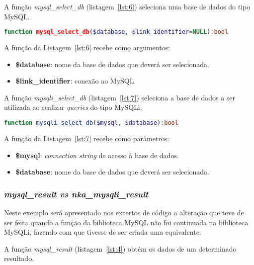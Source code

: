 A função \textit{mysql\_select\_db} (listagem~\ref{lst:6}) seleciona uma base de dados do tipo MySQL.

\begin{lstlisting}[language={php},
                   caption={Função mysql\_select\_db.},
                   label=lst:6]
function mysql_select_db($database, $link_identifier=NULL):bool

\end{lstlisting}

A função da Listagem~\ref{lst:6} recebe como argumentos:
\begin{itemize}
  \item \textbf{\$database}: nome da base de dados que deverá ser selecionada.
  \item \textbf{\$link\_identifier}: conexão ao MySQL.
\end{itemize}


A função \textit{mysqli\_select\_db} (listagem~\ref{lst:7}) seleciona a base de dados a ser utilizada ao realizar \textit{queries} do tipo MySQLi.

\begin{lstlisting}[language={php},
                   caption={Função mysqli\_select\_db.},
                   label=lst:7]
    	function mysqli_select_db($mysql, $database):bool

\end{lstlisting}

A função da Listagem~\ref{lst:7} recebe como parâmetros:
\begin{itemize}
  \item \textbf{\$mysql}: \textit{connection string} de acesso à base de dados.
  \item \textbf{\$database}: nome da base de dados que deverá ser selecionada.
\end{itemize}


\subsubsection{\textit{mysql\_result vs nka\_mysqli\_result}}

Neste exemplo será apresentado nos excertos de código a alteração que teve de ser feita quando a função da biblioteca MySQL não foi continuada na biblioteca MySQLi, fazendo com que tivesse de ser criada uma equivalente.

A função \textit{mysql\_result} (listagem~\ref{lst:4}) obtém os dados de um determinado resultado.

